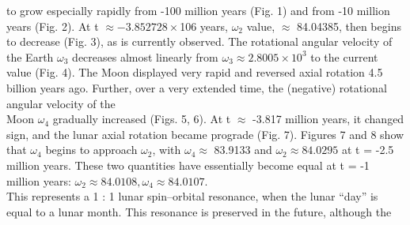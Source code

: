 \documentclass[fontsize = 11pt,a4paper]{article}
\begin{document}
\begin{multicols}{2}
to grow especially rapidly from -100 million years
(Fig. 1) and from -10 million years (Fig. 2). At
t $\approx -3.852728 \times $106 years, $\omega_2$
value, $\approx $ 84.04385, then begins to decrease (Fig. 3),
as is currently observed. The rotational angular
velocity of the Earth $\omega_3$ decreases almost linearly from
$\omega_3 \approx  2.8005 \times {10}^3$ to the current value (Fig. 4). The
Moon displayed very rapid and reversed axial rotation
4.5 billion years ago. Further, over a very extended
time, the (negative) rotational angular velocity of the\\
Moon $\omega_4$ gradually increased (Figs. 5, 6). At t $\approx$
-3.817 million years, it changed sign, and the lunar
axial rotation became prograde (Fig. 7). Figures 7
and 8 show that $\omega_4$ begins to approach $\omega_2$, with $\omega_4 \approx$
83.9133 and $\omega_2 \approx 84.0295$ at t = -2.5 million years.
These two quantities have essentially become equal
at t = -1 million years:  $\omega_2 \approx  84.0108, \omega_4 \approx 84.0107.$\\
This represents a 1 : 1 lunar spin–orbital resonance,
when the lunar “day” is equal to a lunar month. This
resonance is preserved in the future, although the
\end{multicols}
\pagebreak
\end{document}
